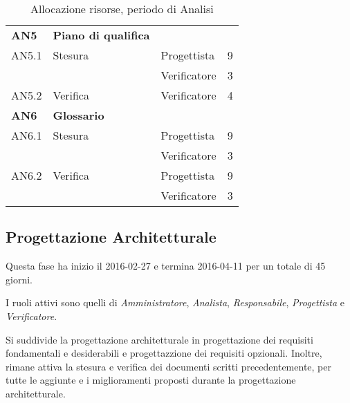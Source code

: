 \begin{table}[H]
\begin{tabular}{ l l l c  }
	
	\hline
	\textbf{AN5} & \textbf{Piano di qualifica} \\
	\cline{3-4}
	AN5.1 & Stesura & Progettista& 9\\ 
    & & Verificatore & 3 \\
    \cline{3-4}
	AN5.2 & Verifica & Verificatore &  4\\

        \hline
	\textbf{AN6} & \textbf{Glossario} \\
	\cline{3-4}
	AN6.1 & Stesura & Progettista& 9\\ 
        & & Verificatore & 3 \\
        \cline{3-4}
	AN6.2 & Verifica & Progettista& 9\\ 
        & & Verificatore & 3 \\
	
	\hline
	\end{tabular}
	\caption{Allocazione risorse, periodo di Analisi}
	\end{table}

\subsection{Progettazione Architetturale}
Questa fase ha inizio il 2016-02-27 e termina 2016-04-11 per un totale di 45 giorni.

I ruoli attivi sono quelli di \textit{Amministratore}, \textit{Analista}, \textit{Responsabile}, \textit{Progettista} e \textit{Verificatore}.

Si suddivide la progettazione architetturale in progettazione dei requisiti fondamentali e desiderabili e progettazzione dei requisiti opzionali. Inoltre, rimane attiva la stesura e verifica dei documenti scritti precedentemente, per tutte le aggiunte e i miglioramenti proposti durante la progettazione architetturale. 

